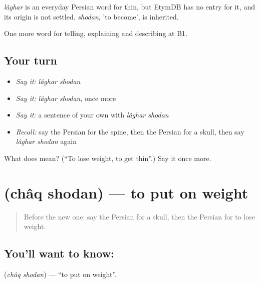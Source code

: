 \begin{cousinweb}
\emph{lâghar} is an everyday Persian word for thin, but EtymDB has no entry for it, and its origin is not settled. \emph{shodan}, 'to become', is inherited.
\end{cousinweb}

\begin{grammarlens}[title={What you've built}]
One more word for telling, explaining and describing at B1.
\end{grammarlens}

\subsection*{Your turn}
\begin{itemize}
\raggedright
  \item \emph{Say it:} \emph{lâghar shodan}
  \item \emph{Say it:} \emph{lâghar shodan}, once more
  \item \emph{Say it:} a sentence of your own with \emph{lâghar shodan}
  \item \emph{Recall:} say the Persian for the spine, then the Persian for a skull, then say \emph{lâghar shodan} again
\end{itemize}

\begin{tcolorbox}[breakable,colback=teal!4,colframe=teal!35!black,title={Before you move on}]
What does   mean? (\textquotedblleft{}To lose weight, to get thin\textquotedblright{}.) Say it once more.
\end{tcolorbox}
\section[\texorpdfstring{\fa{چاق} \fa{شدن} (châq shodan)}{چاق شدن (châq shodan)}]{  (châq shodan) — to put on weight}

\label{lesson:FA-C498-chaq-shodan}



\begin{quote}
Before the new one: say the Persian for a skull, then the Persian for to lose weight.
\end{quote}

\subsection*{You'll want to know:  }
\textbf{ } (\emph{châq shodan}) — \textquotedblleft{}to put on weight\textquotedblright{}.

